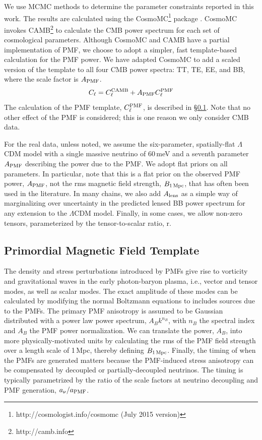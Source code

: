 \documentclass[apj]{emulateapj}
\newcommand{\cpmf}{\ensuremath{C_{\ell}^{\rm PMF}}}
\newcommand{\apmf}{\ensuremath{A_{\rm PMF}}}
\newcommand{\bpmf}{\ensuremath{B_{\rm 1\,Mpc}}}
\newcommand{\alens}{\ensuremath{A_{\rm lens}}}
\newcommand{\lcdm}{\ensuremath{\Lambda}CDM}
\newcommand{\be}{\begin{equation}}
\newcommand{\ee}{\end{equation}}
\begin{document}
We use MCMC methods to determine the parameter constraints reported in this work. 
The results are calculated using  the {\textsc CosmoMC}\footnote{http://cosmologist.info/cosmomc (July 2015 version)} package \citep{lewis02b}. 
CosmoMC invokes  CAMB\footnote{http://camb.info}  \citep{lewis00} to calculate the CMB power spectrum for each set of cosmological parameters. 
Although CosmoMC and CAMB have a partial implementation of PMF, we choose to adopt a simpler, fast template-based calculation for the PMF power. 
We have adapted CosmoMC to add a scaled version of the template to all four CMB power spectra: TT, TE, EE, and BB, where the scale factor is \apmf. 
\be
C_\ell = C_\ell^{\rm{CAMB}} + \apmf \cpmf
\ee
The calculation of the PMF template, \cpmf, is described in \S\ref{sec:template}. 
Note that no other effect of the PMF is considered; this is one reason we only consider CMB data.

For the real data, unless noted, we assume the six-parameter, spatially-flat \lcdm{} model with a single massive neutrino of 60\,meV and a seventh parameter \apmf{} describing the power due to the PMF. 
We adopt flat priors on all parameters. 
In particular, note that this is a flat prior on the observed PMF power, $\apmf$, not the rms magnetic field strength, \bpmf, that has often been used in the literature. 
In many chains, we also add \alens{} as a simple way of marginalizing over uncertainty in the predicted lensed BB power spectrum for any extension to the \lcdm{} model. 
Finally, in some cases, we allow non-zero tensors, parameterized by the tensor-to-scalar ratio, r. 

\subsection{Primordial Magnetic Field Template}
\label{sec:template}

The density and stress perturbations introduced by PMFs give rise to vorticity and gravitational waves in the early photon-baryon  plasma, i.e., vector and tensor modes, as well as scalar modes. 
The exact amplitude of these modes can be calculated by modifying the normal Boltzmann equations to includes sources due to the PMFs. 
The primary PMF anisotropy is assumed to be Gaussian distributed with a power law power spectrum, $A_B k^{n_B}$, with $n_B$ the spectral index and $A_B$ the PMF power normalization. 
We can translate the power, $A_B$, into more physically-motivated units by calculating the rms of the PMF field strength over a length scale of 1\,Mpc, thereby defining \bpmf. 
Finally, the timing of when the PMFs are generated matters because the PMF-induced stress anisotropy can be compensated by decoupled or partially-decoupled neutrinos. 
The timing is typically parametrized by the ratio of the scale factors at neutrino decoupling and PMF generation, $a_{\nu}/a_{\rm{PMF}}$. 
\end{document}
